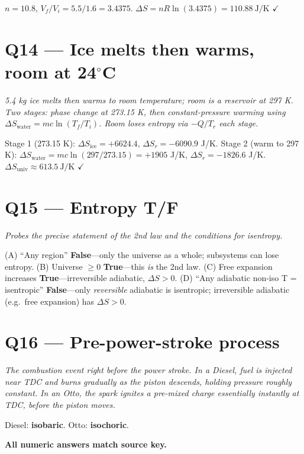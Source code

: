 \documentclass[11pt]{article}
\newcommand{\checkmk}{\ensuremath{\checkmark}}
\begin{document}
$n = 10.8$, $V_f/V_i = 5.5/1.6 = 3.4375$. $\Delta S = nR\ln(3.4375) = \boxed{110.88\ \text{J/K}}$ \checkmk

\section*{Q14 --- Ice melts then warms, room at 24$^\circ$C}
\emph{5.4 kg ice melts then warms to room temperature; room is a reservoir at 297 K. Two stages: phase change at 273.15 K, then constant-pressure warming using $\Delta S_{\text{water}} = mc\ln(T_f/T_i)$. Room loses entropy via $-Q/T_r$ each stage.}

Stage 1 (273.15 K): $\Delta S_{\text{ice}} = +6624.4$, $\Delta S_r = -6090.9$ J/K.
Stage 2 (warm to 297 K): $\Delta S_{\text{water}} = mc\ln(297/273.15) = +1905$ J/K, $\Delta S_r = -1826.6$ J/K.
$\Delta S_{\text{univ}} \approx \boxed{613.5\ \text{J/K}}$ \checkmk

\section*{Q15 --- Entropy T/F}
\emph{Probes the precise statement of the 2nd law and the conditions for isentropy.}

(A) ``Any region'' \textbf{False}---only the universe as a whole; subsystems can lose entropy.
(B) Universe $\ge 0$ \textbf{True}---this \emph{is} the 2nd law.
(C) Free expansion increases \textbf{True}---irreversible adiabatic, $\Delta S > 0$.
(D) ``Any adiabatic non-iso T = isentropic'' \textbf{False}---only \emph{reversible} adiabatic is isentropic; irreversible adiabatic (e.g.\ free expansion) has $\Delta S > 0$.

\section*{Q16 --- Pre-power-stroke process}
\emph{The combustion event right before the power stroke. In a Diesel, fuel is injected near TDC and burns gradually as the piston descends, holding pressure roughly constant. In an Otto, the spark ignites a pre-mixed charge essentially instantly at TDC, before the piston moves.}

Diesel: \textbf{isobaric}. Otto: \textbf{isochoric}.

\bigskip\noindent\textbf{All numeric answers match source key.}
\end{document}
